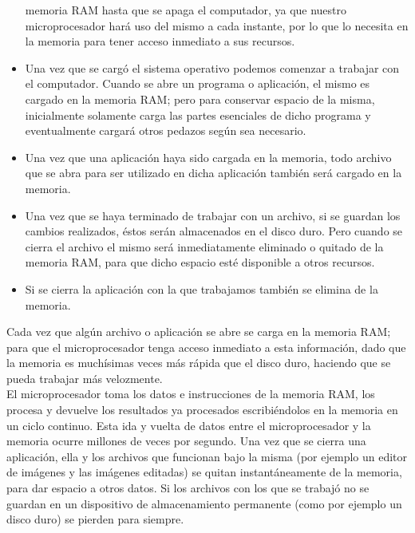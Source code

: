 \documentclass{article}
\begin{document}
\begin{itemize}
memoria RAM hasta que se apaga el computador, ya que nuestro microprocesador hará uso
del mismo a cada instante, por lo que lo necesita en la memoria para tener acceso inmediato
a sus recursos.
\item Una vez que se cargó el sistema operativo podemos comenzar a trabajar con el computador.
Cuando se abre un programa o aplicación, el mismo es cargado en la memoria RAM; pero
para conservar espacio de la misma, inicialmente solamente carga las partes esenciales de
dicho programa y eventualmente cargará otros pedazos según sea necesario.
\item Una vez que una aplicación haya sido cargada en la memoria, todo archivo que se abra para
ser utilizado en dicha aplicación también será cargado en la memoria.
\item Una vez que se haya terminado de trabajar con un archivo, si se guardan los cambios
realizados, éstos serán almacenados en el disco duro. Pero cuando se cierra el archivo el
mismo será inmediatamente eliminado o quitado de la memoria RAM, para que dicho
espacio esté disponible a otros recursos.
\item Si se cierra la aplicación con la que trabajamos también se elimina de la memoria.
\end{itemize}
Cada vez que algún archivo o aplicación se abre se carga en la memoria RAM; para que el
microprocesador tenga acceso inmediato a esta información, dado que la memoria es
muchísimas veces más rápida que el disco duro, haciendo que se pueda trabajar más
velozmente.\\[0.1cm]
El microprocesador toma los datos e instrucciones de la memoria RAM, los procesa y devuelve
los resultados ya procesados escribiéndolos en la memoria en un ciclo continuo. Esta ida y
vuelta de datos entre el microprocesador y la memoria ocurre millones de veces por segundo.
Una vez que se cierra una aplicación, ella y los archivos que funcionan bajo la misma (por
ejemplo un editor de imágenes y las imágenes editadas) se quitan instantáneamente de la
memoria, para dar espacio a otros datos. Si los archivos con los que se trabajó no se guardan en
un dispositivo de almacenamiento permanente (como por ejemplo un disco duro) se pierden
para siempre.
\end{document}
